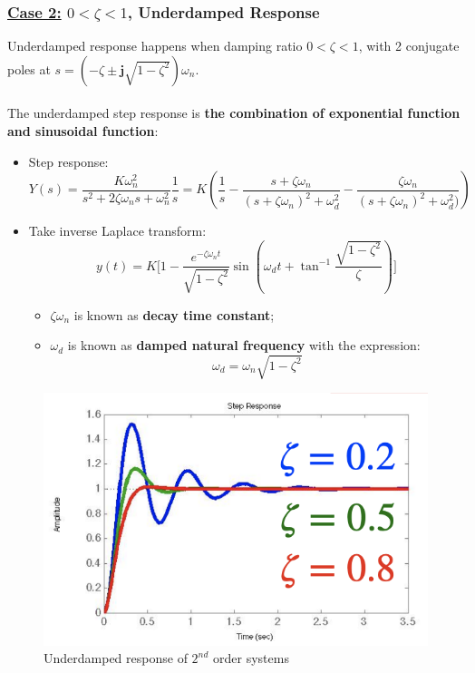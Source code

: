 \documentclass[12pt,a4paper]{article}
\begin{document}
\subsubsection{\underline{Case 2:} $0<\zeta<1$, Underdamped Response}
Underdamped response happens when damping ratio $0<\zeta<1$, with 2 conjugate poles at $s = (-\zeta\pm \mathbf{j} \sqrt{1-\zeta^{2}})\omega_{n}$.\\\\
The underdamped step response is \textbf{the combination of exponential function and sinusoidal function}:
\begin{itemize}
\item Step response:
\[Y(s) = \frac{K\omega_{n}^{2}}{s^{2}	+2\zeta\omega_{n}s+\omega_{n}^{2}} \frac{1}{s} = K(\frac{1}{s}-\frac{s+\zeta\omega_{n}}{(s+\zeta\omega_{n})^{2}+\omega_{d}^{2}}-\frac{\zeta\omega_{n}}{(s+\zeta\omega_{n})^{2}+\omega_{d}^{2})})\]
\item Take inverse Laplace transform:
\[ y(t) = K \bigg[ 1-\frac{e^{-\zeta\omega_{n} t}}{\sqrt{1-\zeta^{2}}} \sin(\omega_{d}t +\tan^{-1}\frac{\sqrt{1-\zeta^{2}}}{\zeta}) \bigg] \]
\begin{itemize}
\item $\zeta\omega_{n}$ is known as \textbf{decay time constant};
\item $\omega_{d}$ is known as \textbf{damped natural frequency} with the expression:
\[\omega_{d} = \omega_{n}\sqrt{1-\zeta^{2}}\]
\end{itemize}
\end{itemize}
\begin{figure}[H] \centering 
\includegraphics[width=.4\textwidth]{images/case2.png}
\caption{Underdamped response of $2^{nd}$ order systems}
\end{figure}
\end{document}
